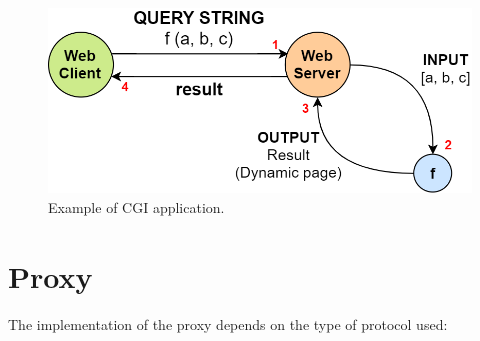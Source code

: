 \begin{figure}[h]
\centering
\includegraphics[scale=0.4]{Images/HTTP/cgi}
\caption{\footnotesize{Example of CGI application.}}\label{cgi}
\end{figure}
\vspace{10cm}
\section{Proxy}
The implementation of the proxy depends on the type of protocol used:
